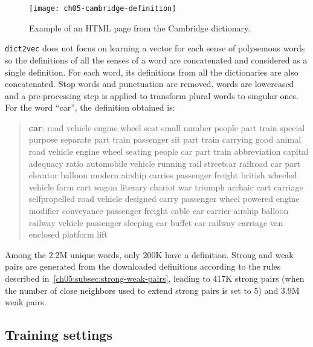     \begin{figure}[h]
      \centering
      \texttt{[image: ch05-cambridge-definition]}
      \caption{Example of an HTML page from the Cambridge dictionary.}
      \label{fig:cambrige}
    \end{figure}

    \noindent \texttt{dict2vec} does not focus on learning a vector for each
    sense of polysemous words so the definitions of all the senses of a word are
    concatenated and considered as a single definition. For each word, its
    definitions from all the dictionaries are also concatenated. Stop words and
    punctuation are removed, words are lowercased and a pre-processing step is
    applied to transform plural words to singular ones. For the word ``car'',
    the definition obtained is:

    \begin{quote}
      \small
      \textbf{car}: road vehicle engine wheel seat small number people part
      train special purpose separate part train passenger sit part train
      carrying good animal road vehicle engine wheel seating people car part
      train abbreviation capital adequacy ratio automobile vehicle running rail
      streetcar railroad car part elevator balloon modern airship carries
      passenger freight british wheeled vehicle farm cart wagon
      literary chariot war triumph archaic cart carriage selfpropelled road
      vehicle designed carry passenger wheel powered engine modifier
      conveyance passenger freight cable car carrier airship balloon railway
      vehicle passenger sleeping car buffet car railway carriage van enclosed
      platform lift
    \end{quote}

    \noindent Among the 2.2M unique words, only 200K have a definition. Strong
    and weak pairs are generated from the downloaded definitions according to
    the rules described in~\autoref{ch05:subsec:strong-weak-pairs}, leading to
    417K strong pairs (when the number of close neighbors used to extend strong
    pairs is set to 5) and 3.9M weak pairs.

  \subsection{Training settings}
    \label{ch05:subsec:training-settings}
